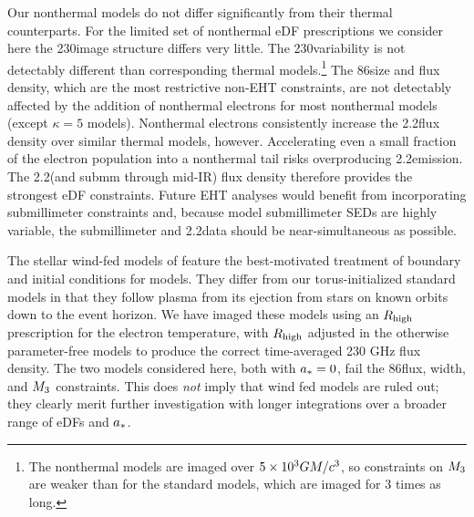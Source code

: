 Our nonthermal models do not differ significantly from their thermal counterparts.
For the limited set of nonthermal eDF prescriptions we consider here the 230\GHz image structure differs very little.  The 230\GHz variability is not detectably different than corresponding thermal models.\footnote{The nonthermal models are imaged over $5\times 10^3GM/c^3$, so constraints on $M_{3}$ are weaker than for the standard models, which are imaged for 3 times as long.}  The 86\GHz size and flux density, which are the most restrictive non-EHT constraints, are not detectably affected by the addition of nonthermal electrons for most nonthermal models (except $\kappa = 5$ models).  Nonthermal electrons consistently increase the 2.2\um flux density over similar thermal models, however.  Accelerating even a small fraction of the electron population into a nonthermal tail risks overproducing 2.2\um emission.  The 2.2\um (and submm through mid-IR) flux density therefore provides the strongest eDF constraints.  Future EHT analyses would benefit from incorporating submillimeter constraints \citep[e.g.]{2019ApJ...881L...2B} and, because model submillimeter SEDs are highly variable, the submillimeter and 2.2\um data  should be near-simultaneous as possible.

The stellar wind-fed models of \cite{2020ApJ...896L...6R} feature the best-motivated treatment of boundary and initial conditions for \sgra models.  They differ from our torus-initialized standard models in that they follow plasma from its ejection from stars on known orbits down to the event horizon.  We have imaged these models using an $R_\mathrm{high}$ prescription for the electron temperature, with $R_\mathrm{high}$ adjusted in the otherwise parameter-free models to produce the correct time-averaged 230 GHz flux density.  The two models considered here, both with $a_* = 0$, fail the 86\GHz flux, \mring width, and $M_{3}$ constraints.  This does {\em not} imply that wind fed models are ruled out; they clearly merit further investigation with longer integrations over a broader range of eDFs and $a_*$.

